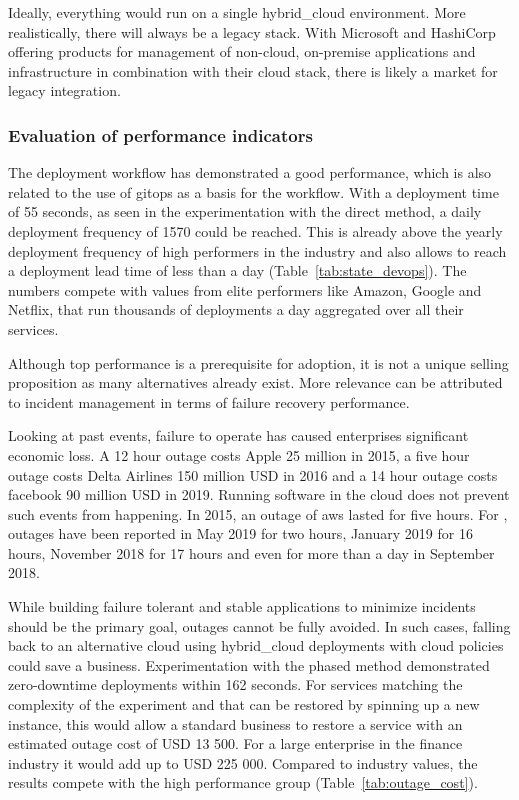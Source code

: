 \documentclass[../main.tex]{subfiles}
\begin{document}
    Ideally, everything would run on a single \gls{hybrid_cloud} environment.
    More realistically, there will always be a legacy stack.
    With Microsoft and HashiCorp offering products for management of non-cloud, on-premise applications and infrastructure in combination with their \gls{cloud} stack, there is likely a market for legacy integration.

    \subsubsection{Evaluation of performance indicators}

    The deployment workflow has demonstrated a good performance, which is also related to the use of \gls{gitops} as a basis for the workflow.
    With a deployment time of 55 seconds, as seen in the experimentation with the direct method, a daily deployment frequency of 1570 could be reached.
    This is already above the yearly deployment frequency of high performers in the industry and also allows to reach a deployment lead time of less than a day (Table~\ref{tab:state_devops}).
    The numbers compete with values from elite performers like Amazon, Google and Netflix, that run thousands of deployments a day aggregated over all their services.\cite{state_of_devops_19}

    

    Although top performance is a prerequisite for adoption, it is not a unique selling proposition as many alternatives already exist.
    More relevance can be attributed to incident management in terms of failure recovery performance.

    Looking at past events, failure to operate has caused enterprises significant economic loss.
    A 12 hour outage costs Apple 25 million in 2015, a five hour outage costs Delta Airlines 150 million USD in 2016 and a 14 hour outage costs facebook 90 million USD in 2019\cite{atlassian_cost_downtime}.
    Running software in the \gls{cloud} does not prevent such events from happening.
    In 2015, an outage of \acrshort{aws} lasted for five hours\cite{cna_patterns}.
    For , outages have been reported in May 2019 for two hours\cite{azure_out_may_19}, January 2019 for 16 hours\cite{azure_out_jan_19}, November 2018 for 17 hours\cite{azure_out_nov_18} and even for more than a day in September 2018\cite{azure_out_sept_18}.

    While building failure tolerant and stable applications to minimize incidents should be the primary goal, outages cannot be fully avoided.
    In such cases, falling back to an alternative \gls{cloud} using \gls{hybrid_cloud} deployments with \gls{cloud} policies could save a business.
    Experimentation with the phased method demonstrated zero-downtime deployments within 162 seconds.
    For services matching the complexity of the experiment and that can be restored by spinning up a new instance, this would allow a standard business to restore a service with an estimated outage cost of USD 13 500.
    For a large enterprise in the finance industry it would add up to USD 225 000.
    Compared to industry values, the results compete with the high performance group (Table~\ref{tab:outage_cost}).
\end{document}
